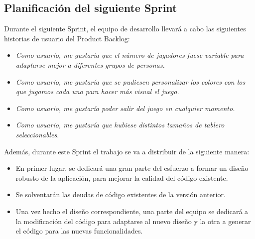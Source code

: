 \documentclass[../../SCRUM.tex]{subfiles}
\begin{document}
\subsection{Planificación del siguiente Sprint}
Durante el siguiente Sprint, el equipo de desarrollo llevará a cabo las siguientes historias de usuario del Product Backlog:
\begin{itemize}
\item \textit{Como usuario, me gustaría que el número de jugadores fuese variable para adaptarse mejor a diferentes grupos de personas.}
\item \textit{Como usuario, me gustaría que se pudiesen personalizar los colores con los que jugamos cada uno para hacer más visual el juego.}
\item \textit{Como usuario, me gustaría poder salir del juego en cualquier momento.}
\item \textit{Como usuario, me gustaría que hubiese distintos tamaños de tablero seleccionables.}
\end{itemize}
Además, durante este Sprint el trabajo se va a distribuir de la siguiente manera:
\begin{itemize}
\item En primer lugar, se dedicará una gran parte del esfuerzo a formar un diseño robusto de la aplicación, para mejorar la calidad del código existente.
\item Se solventarán las deudas de código existentes de la versión anterior.
\item Una vez hecho el diseño correspondiente, una parte del equipo se dedicará a la modificación del código para adaptarse al nuevo diseño y la otra a generar el código para las nuevas funcionalidades.
\end{itemize}
\end{document}
